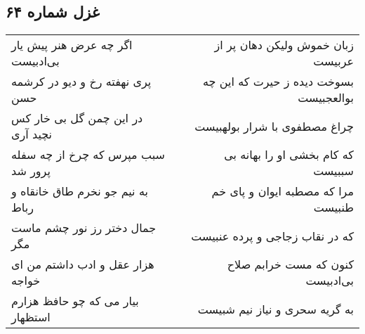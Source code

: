 \begin{center}
\section*{غزل شماره ۶۴}
\label{sec:sh064}
\begin{longtable}{l p{0.5cm} r}
اگر چه عرض هنر پیش یار بی‌ادبیست
&&
زبان خموش ولیکن دهان پر از عربیست
\\
پری نهفته رخ و دیو در کرشمه حسن
&&
بسوخت دیده ز حیرت که این چه بوالعجبیست
\\
در این چمن گل بی خار کس نچید آری
&&
چراغ مصطفوی با شرار بولهبیست
\\
سبب مپرس که چرخ از چه سفله پرور شد
&&
که کام بخشی او را بهانه بی سببیست
\\
به نیم جو نخرم طاق خانقاه و رباط
&&
مرا که مصطبه ایوان و پای خم طنبیست
\\
جمال دختر رز نور چشم ماست مگر
&&
که در نقاب زجاجی و پرده عنبیست
\\
هزار عقل و ادب داشتم من ای خواجه
&&
کنون که مست خرابم صلاح بی‌ادبیست
\\
بیار می که چو حافظ هزارم استظهار
&&
به گریه سحری و نیاز نیم شبیست
\\
\end{longtable}
\end{center}
